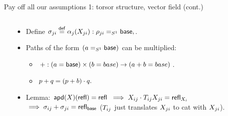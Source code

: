 \begin{frame}{Pay off all our assumptions 1: torsor structure, vector field (cont.)}
\begin{columns}
\begin{column}{0.15\textwidth}

\end{column}
\begin{column}{0.5\textwidth}
\begin{itemize}
\item<2-> Define \( \sigma_{ji}\stackrel{\mathsf{def}}{=} \alpha_j(X_{ji}):\rho_{ji}=_{S^1}\mathsf{base}, \).
\item<3-> Paths of the form \( (a=_{S^1}\mathsf{base}) \) can be multiplied: 
\begin{itemize}
\item \( +:(a=\mathsf{base})\times (b=base)\to (a+ b=base) \).
\item \( p+ q=(p+ b)\cdot q. \)
\end{itemize}
\item<4-> Lemma: \( \mathsf{apd}(X)(\mathsf{refl})=\mathsf{refl}\) \(\implies X_{ij}\cdot T_{ij}X_{ji}=\mathsf{refl}_{X_i}\) \(\implies\sigma_{ij}+\sigma_{ji}=\mathsf{refl}_{\mathsf{base}} \) (\( T_{ij} \) just translates \( X_{ji} \) to cat with \( X_{ji} \)).
\end{itemize}
\end{column}
\begin{column}{0.35\textwidth}
\end{column}
\end{columns}
\end{frame}

